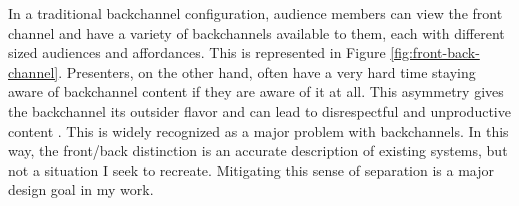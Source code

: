 In a traditional backchannel configuration, audience members can view the front channel and have a variety of backchannels available to them, each with different sized audiences and affordances. This is represented in Figure \ref{fig:front-back-channel}. Presenters, on the other hand, often have a very hard time staying aware of backchannel content if they are aware of it at all. This asymmetry gives the backchannel its outsider flavor and can lead to disrespectful and unproductive content \citep{boyd:Yo36SNyj}. This is widely recognized as a major problem with backchannels. In this way, the front/back distinction is an accurate description of existing systems, but not a situation I seek to recreate.  Mitigating this sense of separation is a major design goal in my work.









